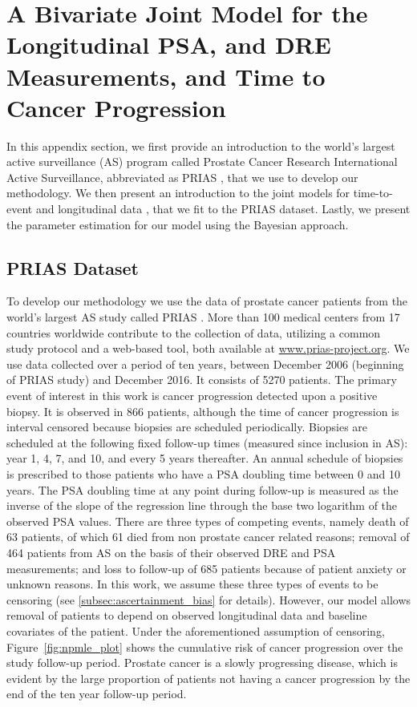 \section{A Bivariate Joint Model for the Longitudinal PSA, and DRE Measurements, and Time to Cancer Progression}
\label{sec:jm_framework}

In this appendix section, we first provide an introduction to the world's largest active surveillance (AS) program called Prostate Cancer Research International Active Surveillance, abbreviated as PRIAS \citep{bokhorst2016decade}, that we use to develop our methodology. We then present an introduction to the joint models for time-to-event and longitudinal data \citep{tsiatis2004joint,rizopoulos2012joint}, that we fit to the PRIAS dataset. Lastly, we present the parameter estimation for our model using the Bayesian approach. 

\subsection{PRIAS Dataset}
To develop our methodology we use the data of prostate cancer patients from the world's largest AS study called PRIAS \cite{bokhorst2016decade}. More than 100 medical centers from 17 countries worldwide contribute to the collection of data, utilizing a common study protocol and a web-based tool, both available at \url{www.prias-project.org}. We use data collected over a period of ten years, between December 2006 (beginning of PRIAS study) and December 2016. It consists of 5270 patients. The primary event of interest in this work is cancer progression detected upon a positive biopsy. It is observed in 866 patients, although the time of cancer progression is interval censored because biopsies are scheduled periodically. Biopsies are scheduled at the  following fixed follow-up times (measured since inclusion in AS): year 1, 4, 7, and 10, and every 5 years thereafter. An annual schedule of biopsies is prescribed to those patients who have a PSA doubling time between 0 and 10 years. The PSA doubling time at any point during follow-up is measured as the inverse of the slope of the regression line through the base two logarithm of the observed PSA values. There are three types of competing events, namely death of 63 patients, of which 61 died from non prostate cancer related reasons; removal of 464 patients from AS on the basis of their observed DRE and PSA measurements; and loss to follow-up of 685 patients because of patient anxiety or unknown reasons. In this work, we assume these three types of events to be censoring (see \ref{subsec:ascertainment_bias} for details). However, our model allows removal of patients to depend on observed longitudinal data and baseline covariates of the patient. Under the aforementioned assumption of censoring, Figure~\ref{fig:npmle_plot} shows the cumulative risk of cancer progression over the study follow-up period. Prostate cancer is a slowly progressing disease, which is evident by the large proportion of patients not having a cancer progression by the end of the ten year follow-up period.

